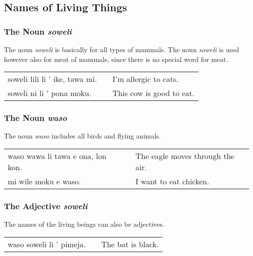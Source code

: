 \subsection*{Names of Living Things}
%
\subsubsection*{The Noun \textit{soweli}}
%
%
The noun \textit{soweli} is basically for all types of mammals. 
The noun \textit{soweli} is used however also for meat of mammals, since there is no special word for meat.

\begin{supertabular}{p{5,5cm}|ll}
soweli lili li ' ike, tawa mi. && I'm allergic to cats. \\
soweli ni li ' pona moku. && This cow is good to eat. \\
\end{supertabular} 
%
\subsubsection*{The Noun \textit{waso}}
%
%
The noun \textit{waso} includes all birds and flying animals. 

\begin{supertabular}{p{5,5cm}|ll}
waso wawa li tawa e ona, lon kon. && The eagle moves through the air. \\
mi wile moku e waso. && I want to eat chicken. \\
\end{supertabular} 

%
\subsubsection*{The Adjective \textit{soweli}}
%
%
The names of the living beings can also be adjectives. 

\begin{supertabular}{p{5,5cm}|ll}
waso soweli li ' pimeja. && The bat is black. \\
\end{supertabular} 

